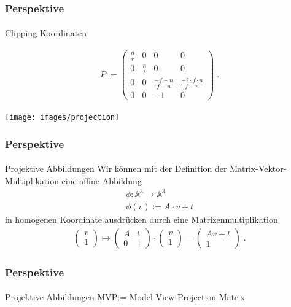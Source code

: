\documentclass{beamer}
\begin{document}
\begin{frame}
    \frametitle{Perspektive}
\framesubtitle{}
\begin{block}{Clipping Koordinaten}

\begin{align*}
P := \begin{pmatrix}  
\frac{n}{r}  &  0 & 0  & 0  \\
0   &  \frac{n}{t} & 0 & 0  \\
0   &  0 & \frac{-f-n}{f-n} & \frac{-2\cdot f \cdot n}{f-n}  \\
0   &  0 & -1 & 0  
\end{pmatrix}  \; .
\end{align*} 



\end{block}
\begin{center}
\texttt{[image: images/projection]}
\end{center}
\end{frame}


\begin{frame}
    \frametitle{Perspektive}
\framesubtitle{}
\begin{block}{Projektive Abbildungen}
Wir können mit der Definition der Matrix-Vektor-Multiplikation eine affine Abbildung 
\begin{align*}
\phi : \mathbb{A}^{3} \to \mathbb{A}^{3} \\
\phi(v):=  A \cdot v + t
\end{align*}
in homogenen Koordinate ausdrücken durch eine Matrizenmultiplikation
\begin{align*}
\begin{pmatrix} v \\ 1\end{pmatrix} \mapsto \begin{pmatrix}  A  & t  \\ 0 &1\end{pmatrix} \cdot  \begin{pmatrix} v \\ 1\end{pmatrix}  =    \begin{pmatrix}  A v +t   \\ 1\end{pmatrix}  \; .
\end{align*}
\end{block}
\end{frame}


\begin{frame}
    \frametitle{Perspektive}
\framesubtitle{}
\begin{block}{Projektive Abbildungen}
MVP:= Model View Projection Matrix
\end{block}
\end{frame}
\end{document}
